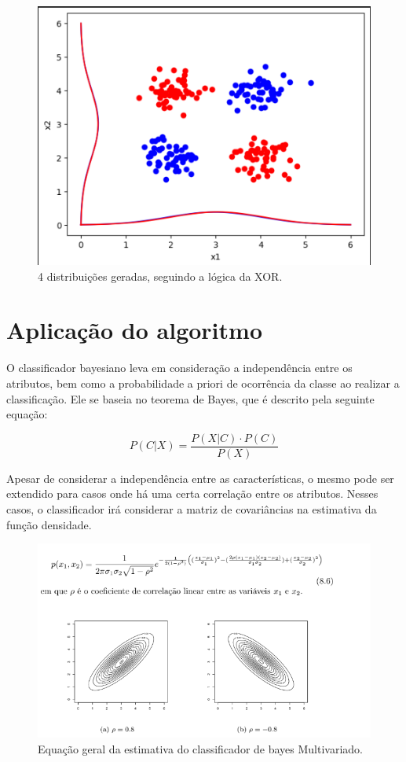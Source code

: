 \documentclass{article}
\begin{document}
 \begin{figure}[h]
    \centering
    \includegraphics[width=0.75\linewidth]{xor_distribution.png}
    \caption{4 distribuições geradas, seguindo a lógica da XOR.}
    \label{fig:kernel_types}
 \end{figure}



 \section{Aplicação do algoritmo}

 O classificador bayesiano leva em consideração a independência entre os atributos, bem como a probabilidade a priori de ocorrência da classe ao realizar a classificação. Ele se baseia no teorema de Bayes, que é descrito pela seguinte equação:
 
 \[
P(C|X) = \frac{P(X|C) \cdot P(C)}{P(X)}
\]

Apesar de considerar a independência entre as características, o mesmo pode ser extendido para casos onde há uma certa correlação entre os atributos. Nesses casos, o classificador irá considerar a matriz de covariâncias na estimativa da função densidade.

\begin{figure}[h]
    \centering
    \includegraphics[width=0.75\linewidth]{caso_geral_bayes.png}
    \caption{Equação geral da estimativa do classificador de bayes Multivariado.}
    \label{fig:kernel_types}
 \end{figure}
\end{document}
